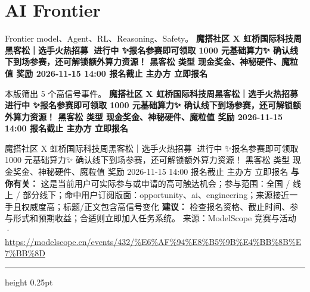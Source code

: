 \documentclass[10.5pt]{ctexart}
\begin{document}
\section*{AI Frontier}
{\color{ormuted} Frontier model、Agent、RL、Reasoning、Safety。}
\vspace{2mm}
{\LARGE\bfseries 魔搭社区 X 虹桥国际科技周黑客松｜选手火热招募🚀 进行中 ✨报名参赛即可领取 1000 元基础算力✨ 确认线下到场参赛，还可解锁额外算力资源！ 黑客松 类型 现金奖金、神秘硬件、魔粒值 奖励 2026-11-15 14:00 报名截止 主办方 立即报名}\par
\vspace{1mm}
{\color{ormuted} 本版筛出 5 个高信号事件。}
\vspace{3mm}
{\Large\bfseries 魔搭社区 X 虹桥国际科技周黑客松｜选手火热招募🚀 进行中 ✨报名参赛即可领取 1000 元基础算力✨ 确认线下到场参赛，还可解锁额外算力资源！ 黑客松 类型 现金奖金、神秘硬件、魔粒值 奖励 2026-11-15 14:00 报名截止 主办方 立即报名}\par
魔搭社区 X 虹桥国际科技周黑客松｜选手火热招募🚀 进行中 ✨报名参赛即可领取 1000 元基础算力✨ 确认线下到场参赛，还可解锁额外算力资源！ 黑客松 类型 现金奖金、神秘硬件、魔粒值 奖励 2026-11-15 14:00 报名截止 主办方 立即报名
\textbf{与你有关：} 这是当前用户可实际参与或申请的高可触达机会；参与范围：全国 / 线上 / 部分线下；命中用户订阅版面：opportunity、ai、engineering；来源接近一手且权威度高；标题/正文包含高信号变化
\textbf{建议：} 检查报名资格、截止时间、参与形式和预期收益；合适则立即加入任务系统。
{\footnotesize\color{ormuted} 来源：ModelScope 竞赛与活动 · \url{https://modelscope.cn/events/432/%E6%AF%94%E8%B5%9B%E4%BB%8B%E7%BB%8D}}
\vspace{4mm}
\hrule height 0.25pt
\vspace{3mm}
\end{document}
